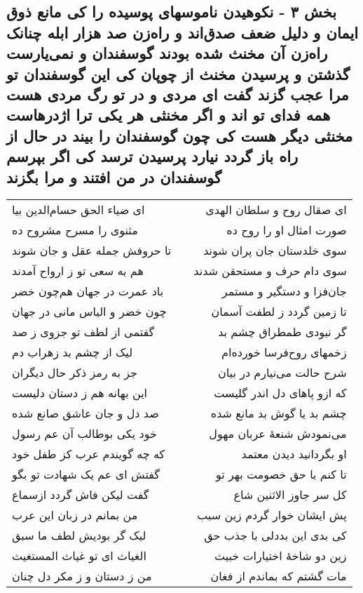 \begin{center}
\section*{بخش ۳ - نکوهیدن ناموسهای پوسیده را کی مانع ذوق ایمان و دلیل ضعف صدق‌اند و راه‌زن صد هزار ابله چنانک راه‌زن آن مخنث شده بودند گوسفندان و نمی‌یارست گذشتن و پرسیدن مخنث از چوپان کی این گوسفندان تو مرا عجب گزند گفت ای مردی و در تو رگ مردی هست همه فدای تو اند و اگر مخنثی هر یکی ترا اژدرهاست مخنثی دیگر هست کی چون گوسفندان را بیند در حال از راه باز گردد نیارد پرسیدن ترسد کی اگر بپرسم گوسفندان در من افتند و مرا بگزند}
\label{sec:sh003}
\begin{longtable}{l p{0.5cm} r}
ای ضیاء الحق حسام‌الدین بیا
&&
ای صقال روح و سلطان الهدی
\\
مثنوی را مسرح مشروح ده
&&
صورت امثال او را روح ده
\\
تا حروفش جمله عقل و جان شوند
&&
سوی خلدستان جان پران شوند
\\
هم به سعی تو ز ارواح آمدند
&&
سوی دام حرف و مستحقن شدند
\\
باد عمرت در جهان هم‌چون خضر
&&
جان‌فزا و دستگیر و مستمر
\\
چون خضر و الیاس مانی در جهان
&&
تا زمین گردد ز لطفت آسمان
\\
گفتمی از لطف تو جزوی ز صد
&&
گر نبودی طمطراق چشم بد
\\
لیک از چشم بد زهراب دم
&&
زخمهای روح‌فرسا خورده‌ام
\\
جز به رمز ذکر حال دیگران
&&
شرح حالت می‌نیارم در بیان
\\
این بهانه هم ز دستان دلیست
&&
که ازو پاهای دل اندر گلیست
\\
صد دل و جان عاشق صانع شده
&&
چشم بد یا گوش بد مانع شده
\\
خود یکی بوطالب آن عم رسول
&&
می‌نمودش شنعهٔ عربان مهول
\\
که چه گویندم عرب کز طفل خود
&&
او بگردانید دیدن معتمد
\\
گفتش ای عم یک شهادت تو بگو
&&
تا کنم با حق خصومت بهر تو
\\
گفت لیکن فاش گردد ازسماع
&&
کل سر جاوز الاثنین شاع
\\
من بمانم در زبان این عرب
&&
پش ایشان خوار گردم زین سبب
\\
لیک گر بودیش لطف ما سبق
&&
کی بدی این بددلی با جذب حق
\\
الغیاث ای تو غیاث المستغیث
&&
زین دو شاخهٔ اختیارات خبیث
\\
من ز دستان و ز مکر دل چنان
&&
مات گشتم که بماندم از فغان
\\

\end{longtable}
\end{center}
